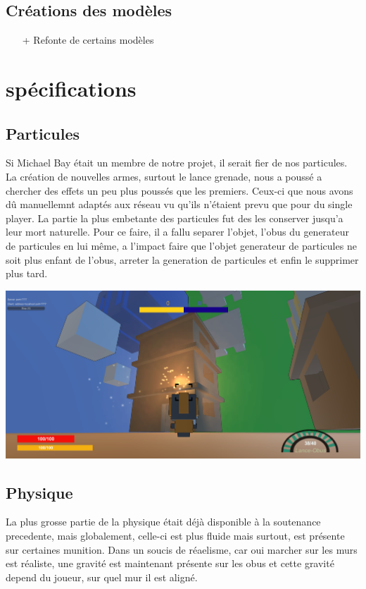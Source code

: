 ﻿\documentclass[12pt]{article}
\begin{document}
\subsection{Créations des modèles}
\begin{itemize}
\item[+] Refonte de certains modèles
\end{itemize}
\section {spécifications}
\subsection {Particules}

Si Michael Bay était un membre de notre projet, il serait fier de nos particules. La création de 
nouvelles armes, surtout le lance grenade, nous a poussé a chercher des effets un peu plus poussés 
que les premiers. Ceux-ci que nous avons dû manuellemnt adaptés aux réseau vu qu'ils n'étaient prevu 
que pour du single player. La partie la plus embetante des particules fut des les conserver jusqu'a 
leur mort naturelle. Pour ce faire, il a fallu separer l'objet, l'obus du generateur de particules 
en lui même, a l'impact faire que l'objet generateur de particules ne soit plus enfant de l'obus, 
arreter la generation de particules et enfin le supprimer plus tard.

\centerline{\includegraphics[scale=0.4]{explosion.png}}


\subsection {Physique}
La plus grosse partie de la physique était déjà disponible à la soutenance precedente, mais globalement,
celle-ci est plus fluide mais surtout, est présente sur certaines munition. Dans un soucis de réaelisme,
car oui marcher sur les murs est réaliste, une gravité est maintenant présente sur les obus et cette
gravité depend du joueur, sur quel mur il est aligné.
\end{document}
